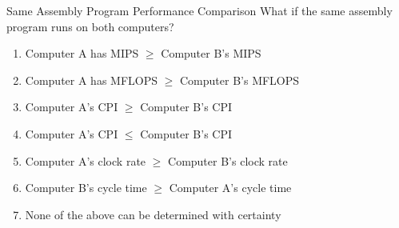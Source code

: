 \documentclass[aspectratio=169,12pt]{beamer}
\begin{document}
\begin{frame}{Same Assembly Program Performance Comparison}
What if the same assembly program runs on both computers?

\begin{enumerate}
    \item Computer A has MIPS $\geq$ Computer B's MIPS
    \item Computer A has MFLOPS $\geq$ Computer B's MFLOPS
    \item Computer A's CPI $\geq$ Computer B's CPI
    \item Computer A's CPI $\leq$ Computer B's CPI
    \item Computer A's clock rate $\geq$ Computer B's clock rate
    \item Computer B's cycle time $\geq$ Computer A's cycle time
    \item None of the above can be determined with certainty
\end{enumerate}\end{frame}
\end{document}
